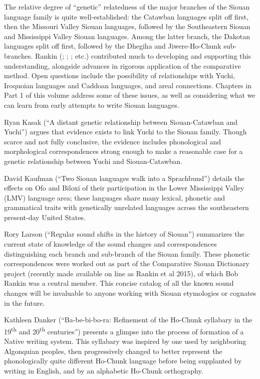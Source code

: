 \begin{refsection}

The relative degree of ``genetic'' relatedness of the major branches of the Siouan language family is quite well-established: the Catawban languages split off first, then the Missouri Valley Siouan languages, followed by the Southeastern Siouan and Mississippi Valley Siouan languages. Among the latter branch, the Dakotan languages split off first, followed by the Dhegiha and Jiwere-Ho-Chunk sub-branches. Rankin (\citeyear{Rankin1988}; \citeyear{1998}; \citealt{RankinEtAl1998}; etc.) contributed much to developing and supporting this understanding, alongside advances in rigorous application of the comparative method. Open questions include the possibility of relationships with Yuchi, Iroquoian languages and Caddoan languages, and areal connections. Chapters in Part 1 of this volume address some of these issues, as well as considering what we can learn from early attempts to write Siouan languages.

Ryan Kasak (``A distant genetic relationship between Siouan-Catawban and Yuchi'') argues that evidence exists to link Yuchi to the Siouan family. Though scarce and not fully conclusive, the evidence includes phonological and morphological correspondences strong enough to make a reasonable case for a genetic relationship between Yuchi and Siouan-Catawban. 

David Kaufman (``Two Siouan languages walk into a Sprachbund'') details the effects on Ofo and Biloxi of their participation in the Lower Mississippi Valley (LMV) language area; these languages share many lexical, phonetic and grammatical traits with genetically unrelated languages across the southeastern present-day United States. 

Rory Larson (``Regular sound shifts in the history of Siouan'') summarizes the current state of knowledge of the sound changes and correspondences distinguishing each branch and sub-branch of the Siouan family. These phonetic correspondences were worked out as part of the Comparative Siouan Dictionary project (recently made available on line as Rankin et al 2015), of which Bob Rankin was a central member. This concise catalog of all the known sound changes will be invaluable to anyone working with Siouan etymologies or cognates in the future.

Kathleen Danker (``Ba-be-bi-bo-ra: Refinement of the Ho-Chunk syllabary in the 19\textsuperscript{th} and 20\textsuperscript{th} centuries'') presents a glimpse into the process of formation of a Native writing system. This syllabary was inspired by one used by neighboring Algonquian peoples, then progressively changed to better represent the phonologically quite different Ho-Chunk language before being supplanted by writing in English, and by an alphabetic Ho-Chunk orthography.


\end{refsection}

